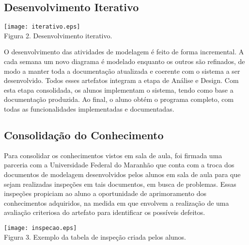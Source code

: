\documentclass[a0, portrait, final]{a0poster}
\begin{document}
\begin{multicols}{3}
\subsection{Desenvolvimento Iterativo}
\begin{spacing}{3.0}
\begin{center}
	\texttt{[image: iterativo.eps]}\\
	{\normalsize Figura 2. Desenvolvimento iterativo.}\\
\end{center}
\vspace{1.5cm}
{\large O desenvolvimento das atividades de modelagem é feito de forma incremental. A cada semana um novo diagrama é modelado enquanto os outros são refinados, de modo a manter toda a documentação atualizada e coerente com o sistema a ser desenvolvido. Todos esses artefatos integram a etapa de Análise e Design. Com esta etapa consolidada, os alunos implementam o sistema, tendo como base a documentação produzida. Ao final, o aluno obtém o programa completo, com todas as funcionalidades implementadas e documentadas.}
\end{spacing}

\subsection{Consolidação do Conhecimento}
\begin{spacing}{3.0}
{\large Para consolidar os conhecimentos vistos em sala de aula, foi firmada uma parceria com a Universidade Federal do Maranhão que conta com a troca dos documentos de modelagem desenvolvidos pelos alunos em sala de aula para que sejam realizadas inspeções em tais documentos, em busca de problemas. Essas inspeções propiciam ao aluno a oportunidade de aprimoramento dos conhecimentos adquiridos, na medida em que envolvem a realização de uma avaliação criteriosa do artefato para identificar os possíveis defeitos.}
\end{spacing}

\begin{center}
	\texttt{[image: inspecao.eps]}\\
	{\normalsize Figura 3. Exemplo da tabela de inspeção criada pelos alunos.}\\
\end{center}
\vspace{1.0cm}


\end{multicols}
\end{document}
